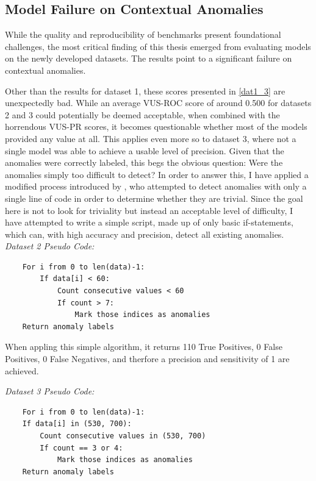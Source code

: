 \documentclass[12pt,oneside]{article}
\begin{document}
\subsection{Model Failure on Contextual Anomalies}

While the quality and reproducibility of benchmarks present foundational challenges, the most critical finding of this thesis emerged from evaluating models on the newly developed datasets. The results point to a significant failure on contextual anomalies. \par
Other than the results for dataset 1, these scores presented in \ref{dat1_3} are unexpectedly bad. While an average VUS-ROC score of around 0.500 for datasets 2 and 3 could potentially be deemed acceptable, when combined with the horrendous VUS-PR scores, it becomes questionable whether most of the models provided any value at all. This applies even more so to dataset 3, where not a single model was able to achieve a usable level of precision. Given that the anomalies were correctly labeled, this begs the obvious question: Were the anomalies simply too difficult to detect? In order to answer this, I have applied a modified process introduced by \cite{wu2021current}, who attempted to detect anomalies with only a single line of code in order to determine whether they are trivial. Since the goal here is not to look for triviality but instead an acceptable level of difficulty, I have attempted to write a simple script, made up of only basic if-statements, which can, with high accuracy and precision, detect all existing anomalies.
\textit{Dataset 2 Pseudo Code:} \par
\begin{lstlisting}
    For i from 0 to len(data)-1:
        If data[i] < 60:
            Count consecutive values < 60
            If count > 7:
                Mark those indices as anomalies
    Return anomaly labels
\end{lstlisting}
\par
When appling this simple algorithm, it returns 110 True Positives, 0 False Positives, 0 False Negatives, and therfore a precision and sensitivity of 1 are achieved.\par
\textit{Dataset 3 Pseudo Code:} \par
\begin{lstlisting}
    For i from 0 to len(data)-1:
    If data[i] in (530, 700):
        Count consecutive values in (530, 700)
        If count == 3 or 4:
            Mark those indices as anomalies
    Return anomaly labels
\end{lstlisting}
\end{document}
